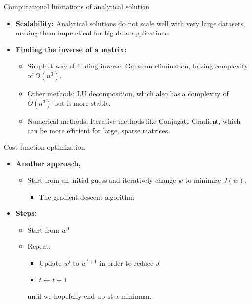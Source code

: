 \documentclass[serif, aspectratio=169]{beamer}
\begin{document}
    \begin{frame}{Computational limitations of analytical solution}
        \begin{itemize}
            \item \textbf{Scalability:} Analytical solutions do not scale well with very large datasets, making them impractical for big data applications.
            \item \textbf{Finding the inverse of a matrix:}
            \begin{itemize}
                \item Simplest way of finding inverse: Gaussian elimination, having complexity of \(O(n^3)\).
                \item Other methods: LU decomposition, which also has a complexity of \(O(n^3)\) but is more stable.
                \item Numerical methods: Iterative methods like Conjugate Gradient, which can be more efficient for large, sparse matrices.
            \end{itemize}
        \end{itemize}
    \end{frame}




    \begin{frame}{Cost function optimization}

        \begin{itemize}
            \item \textbf{Another approach,}
            \begin{itemize}
                \item Start from an initial guess and iteratively change \( w \) to minimize \( J(w) \).
                \begin{itemize}
                    \item The gradient descent algorithm
                \end{itemize}
            \end{itemize}

            \item \textbf{Steps:}
            \begin{itemize}
                \item Start from \( w^0 \)
                \item Repeat:
                \begin{itemize}
                    \item Update \( w^t \) to \( w^{t+1} \) in order to reduce \( J \)
                    \item \( t \leftarrow t + 1 \)
                \end{itemize}
                until we hopefully end up at a minimum.
            \end{itemize}
        \end{itemize}

    \end{frame}
\end{document}
